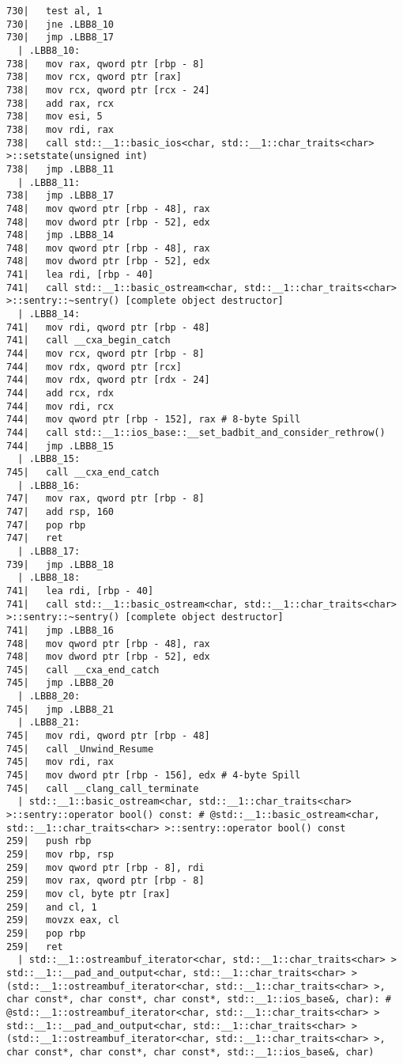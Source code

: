 \begin{lstlisting}[language={},numbers=none,title=\href{https://godbolt.org/z/hwKje8}{\texttt{godbolt.org/z/hwKje8}}]
730|   test al, 1
730|   jne .LBB8_10
730|   jmp .LBB8_17
  | .LBB8_10:
738|   mov rax, qword ptr [rbp - 8]
738|   mov rcx, qword ptr [rax]
738|   mov rcx, qword ptr [rcx - 24]
738|   add rax, rcx
738|   mov esi, 5
738|   mov rdi, rax
738|   call std::__1::basic_ios<char, std::__1::char_traits<char> >::setstate(unsigned int)
738|   jmp .LBB8_11
  | .LBB8_11:
738|   jmp .LBB8_17
748|   mov qword ptr [rbp - 48], rax
748|   mov dword ptr [rbp - 52], edx
748|   jmp .LBB8_14
748|   mov qword ptr [rbp - 48], rax
748|   mov dword ptr [rbp - 52], edx
741|   lea rdi, [rbp - 40]
741|   call std::__1::basic_ostream<char, std::__1::char_traits<char> >::sentry::~sentry() [complete object destructor]
  | .LBB8_14:
741|   mov rdi, qword ptr [rbp - 48]
741|   call __cxa_begin_catch
744|   mov rcx, qword ptr [rbp - 8]
744|   mov rdx, qword ptr [rcx]
744|   mov rdx, qword ptr [rdx - 24]
744|   add rcx, rdx
744|   mov rdi, rcx
744|   mov qword ptr [rbp - 152], rax # 8-byte Spill
744|   call std::__1::ios_base::__set_badbit_and_consider_rethrow()
744|   jmp .LBB8_15
  | .LBB8_15:
745|   call __cxa_end_catch
  | .LBB8_16:
747|   mov rax, qword ptr [rbp - 8]
747|   add rsp, 160
747|   pop rbp
747|   ret
  | .LBB8_17:
739|   jmp .LBB8_18
  | .LBB8_18:
741|   lea rdi, [rbp - 40]
741|   call std::__1::basic_ostream<char, std::__1::char_traits<char> >::sentry::~sentry() [complete object destructor]
741|   jmp .LBB8_16
748|   mov qword ptr [rbp - 48], rax
748|   mov dword ptr [rbp - 52], edx
745|   call __cxa_end_catch
745|   jmp .LBB8_20
  | .LBB8_20:
745|   jmp .LBB8_21
  | .LBB8_21:
745|   mov rdi, qword ptr [rbp - 48]
745|   call _Unwind_Resume
745|   mov rdi, rax
745|   mov dword ptr [rbp - 156], edx # 4-byte Spill
745|   call __clang_call_terminate
  | std::__1::basic_ostream<char, std::__1::char_traits<char> >::sentry::operator bool() const: # @std::__1::basic_ostream<char, std::__1::char_traits<char> >::sentry::operator bool() const
259|   push rbp
259|   mov rbp, rsp
259|   mov qword ptr [rbp - 8], rdi
259|   mov rax, qword ptr [rbp - 8]
259|   mov cl, byte ptr [rax]
259|   and cl, 1
259|   movzx eax, cl
259|   pop rbp
259|   ret
  | std::__1::ostreambuf_iterator<char, std::__1::char_traits<char> > std::__1::__pad_and_output<char, std::__1::char_traits<char> >(std::__1::ostreambuf_iterator<char, std::__1::char_traits<char> >, char const*, char const*, char const*, std::__1::ios_base&, char): # @std::__1::ostreambuf_iterator<char, std::__1::char_traits<char> > std::__1::__pad_and_output<char, std::__1::char_traits<char> >(std::__1::ostreambuf_iterator<char, std::__1::char_traits<char> >, char const*, char const*, char const*, std::__1::ios_base&, char)

\end{lstlisting}

